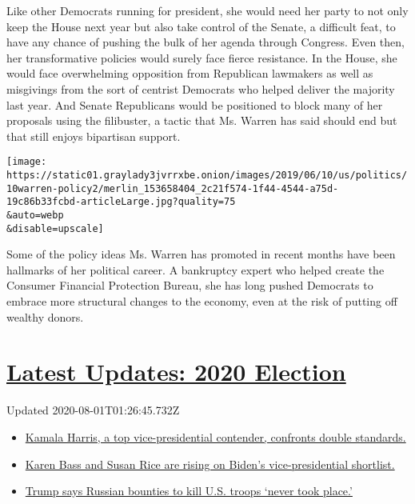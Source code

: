 Like other Democrats running for president, she would need her party to
not only keep the House next year but also take control of the Senate, a
difficult feat, to have any chance of pushing the bulk of her agenda
through Congress. Even then, her transformative policies would surely
face fierce resistance. In the House, she would face overwhelming
opposition from Republican lawmakers as well as misgivings from the sort
of centrist Democrats who helped deliver the majority last year. And
Senate Republicans would be positioned to block many of her proposals
using the filibuster, a tactic that Ms. Warren has said should end but
that still enjoys bipartisan support.

\texttt{[image: https://static01.graylady3jvrrxbe.onion/images/2019/06/10/us/politics/10warren-policy2/merlin\_153658404\_2c21f574-1f44-4544-a75d-19c86b33fcbd-articleLarge.jpg?quality=75\\\&auto=webp\\\&disable=upscale]}

Some of the policy ideas Ms. Warren has promoted in recent months have
been hallmarks of her political career. A bankruptcy expert who helped
create the Consumer Financial Protection Bureau, she has long pushed
Democrats to embrace more structural changes to the economy, even at the
risk of putting off wealthy donors.

\hypertarget{latest-updates-2020-election}{%
\section{\texorpdfstring{\href{https://www.nytimes3xbfgragh.onion/2020/07/31/us/elections/biden-vs-trump.html?action=click\&pgtype=Article\&state=default\&region=MAIN_CONTENT_1\&context=storylines_live_updates}{Latest
Updates: 2020
Election}}{Latest Updates: 2020 Election}}\label{latest-updates-2020-election}}

Updated 2020-08-01T01:26:45.732Z

\begin{itemize}
\tightlist
\item
  \href{https://www.nytimes3xbfgragh.onion/2020/07/31/us/elections/biden-vs-trump.html?action=click\&pgtype=Article\&state=default\&region=MAIN_CONTENT_1\&context=storylines_live_updates\#link-29fdff45}{Kamala
  Harris, a top vice-presidential contender, confronts double
  standards.}
\item
  \href{https://www.nytimes3xbfgragh.onion/2020/07/31/us/elections/biden-vs-trump.html?action=click\&pgtype=Article\&state=default\&region=MAIN_CONTENT_1\&context=storylines_live_updates\#link-13ec3d9c}{Karen
  Bass and Susan Rice are rising on Biden's vice-presidential
  shortlist.}
\item
  \href{https://www.nytimes3xbfgragh.onion/2020/07/31/us/elections/biden-vs-trump.html?action=click\&pgtype=Article\&state=default\&region=MAIN_CONTENT_1\&context=storylines_live_updates\#link-49e9a016}{Trump
  says Russian bounties to kill U.S. troops `never took place.'}
\end{itemize}


